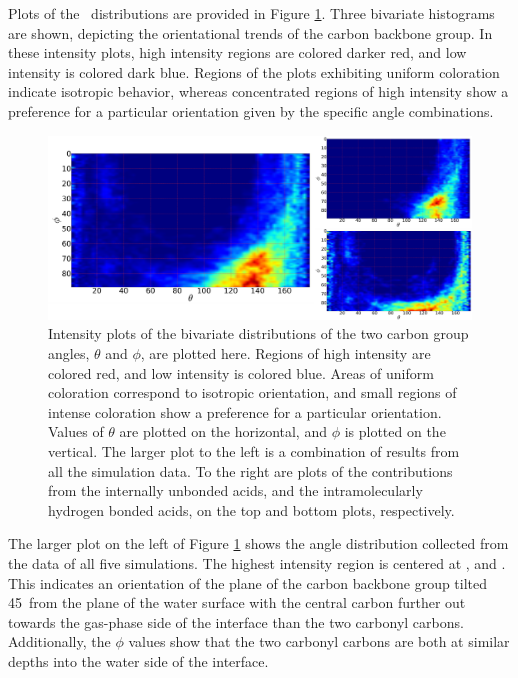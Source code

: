 Plots of the \thetaphi~distributions are provided in Figure \ref{fig:theta-phi}. Three bivariate histograms are shown, depicting the orientational trends of the carbon backbone group. In these intensity plots, high intensity regions are colored darker red, and low intensity is colored dark blue. Regions of the plots exhibiting uniform coloration indicate isotropic behavior, whereas concentrated regions of high intensity show a preference for a particular orientation given by the specific angle combinations.

\begin{figure}[h!]
	\begin{center}
		\includegraphics[scale=1.0]{images/orientation/theta-phi.png}
		\caption{Intensity plots of the bivariate distributions of the two carbon group angles, $\theta$ and $\phi$, are plotted here. Regions of high intensity are colored red, and low intensity is colored blue. Areas of uniform coloration correspond to isotropic orientation, and small regions of intense coloration show a preference for a particular orientation. Values of $\theta$ are plotted on the horizontal, and $\phi$ is plotted on the vertical. The larger plot to the left is  a combination of results from all the simulation data. To the right are plots of the contributions from the internally unbonded acids, and the intramolecularly hydrogen bonded acids, on the top and bottom plots, respectively.}
		\label{fig:theta-phi}
	\end{center}
\end{figure}


The larger plot on the left of Figure \ref{fig:theta-phi} shows the angle distribution collected from the data of all five simulations. The highest intensity region is centered at \degr, and \degr. This indicates an orientation of the plane of the carbon backbone group tilted 45\degr~from the plane of the water surface with the central carbon further out towards the gas-phase side of the interface than the two carbonyl carbons. Additionally, the $\phi$ values show that the two carbonyl carbons are both at similar depths into the water side of the interface.

